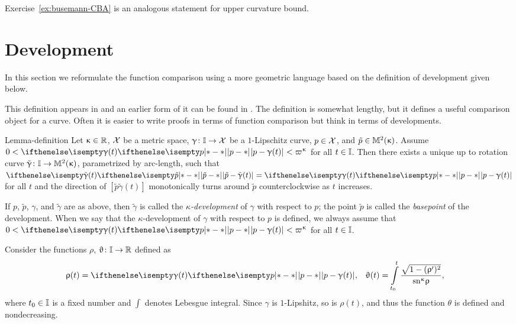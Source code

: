 Exercise~\ref{ex:busemann-CBA} is an analogous statement for upper curvature bound.

\section{Development}

In this section we reformulate the function comparison using a more geometric language based on the definition of development given below.

This definition appears in \cite{alexandrov:devel}
and an earlier form of it can be found in \cite{liberman}.
The definition is somewhat lengthy, but it defines a useful comparison object for a curve. 
Often it is easier to write proofs in terms of function comparison but think in terms of developments.

\begin{thm}{Lemma-definition}\label{lem:devel}\label{def:devel}
Let $\kappa\in \RR$, 
$\mathcal{X}$ be a metric space, 
$\gamma\:\II\to \spc{X}$ be a $1$-Lipschitz curve,
$p\in \spc{X}$,
and $\tilde p\in\Lob2{\kappa}$.
Assume $0<\dist{p}{\gamma(t)}{} < \varpi\kappa$ for
all $t\in \II$.
Then there exists a unique up to rotation curve
$\tilde \gamma\: \II\to \Lob2\kappa$, parametrized by arc-length, 
such that
$\dist{\tilde p}{\tilde \gamma(t)}{}\z=\dist{p}{\gamma(t)}{}$ for all $t$
and the direction of
$[\tilde p\tilde \gamma(t)]$ monotonically turns around $\tilde p$ counterclockwise as $t$ increases.

\smallskip

If $p$, $\tilde p$, $\gamma$, and $\tilde \gamma$ are as above,
then $\tilde \gamma$ is called the \emph{$\kappa$-development} of $\gamma$ with respect to $p$; 
the point $\tilde p$ is called the \emph{basepoint} of the development.
When we say that the $\kappa$-development of $\gamma$ with respect to $p$ is defined, we always assume that $0<\dist{p}{\gamma(t)}{} < \varpi\kappa$ for
all 
$t\in \II$.
\end{thm}

Consider the functions $\rho$, $\theta\:\II\to\RR$ defined as 
\begin{align*}
\rho(t)
&=\dist{p}{\gamma(t)}{},
&
\theta(t)
&=
\int\limits_{t_0}^{t}\frac{\sqrt{1-(\rho')^2}}{\sn\kappa\rho},
\end{align*}
where $t_0\in\II$ is a fixed number and $\int$ denotes Lebesgue integral.
Since $\gamma$ is $1$-Lipshitz, so is $\rho(t)$, and thus the function $\theta$ is defined and nondecreasing.

